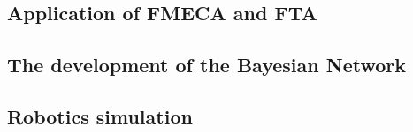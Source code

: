 \subsection{Application of FMECA and FTA}

\subsection{The development of the Bayesian Network}

\subsection{Robotics simulation}



